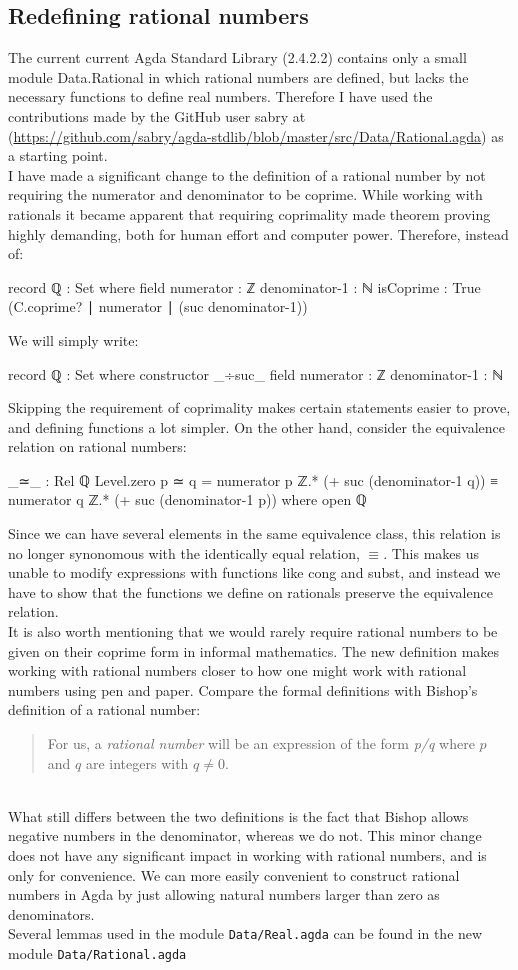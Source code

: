 \documentclass[11pt,a4paper]{article}
\begin{document}
\subsection{Redefining rational numbers}
The current current Agda Standard Library (2.4.2.2) contains only a small module Data.Rational in which rational numbers are defined, but lacks the necessary functions to define real numbers. Therefore I have used the contributions made by the GitHub user sabry at (\url{https://github.com/sabry/agda-stdlib/blob/master/src/Data/Rational.agda}) as a starting point. \\
I have made a significant change to the definition of a rational number by not requiring the numerator and denominator to be coprime. While working with rationals it became apparent that requiring coprimality made theorem proving highly demanding, both for human effort and computer power. Therefore, instead of:
\begin{code}
record ℚ : Set where
  field
    numerator     : ℤ
    denominator-1 : ℕ
    isCoprime     : True (C.coprime? ∣ numerator ∣ (suc denominator-1))
\end{code}
We will simply write:
\begin{code}
record ℚ : Set where
  constructor _÷suc_
  field
    numerator     : ℤ
    denominator-1 : ℕ
\end{code}
Skipping the requirement of coprimality makes certain statements easier to prove, and defining functions a lot simpler. On the other hand, consider the equivalence relation on rational numbers:
\begin{code}
_≃_ : Rel ℚ Level.zero
p ≃ q = numerator p ℤ.* (+ suc (denominator-1 q)) ≡
        numerator q ℤ.* (+ suc (denominator-1 p))
  where open ℚ
\end{code}
Since we can have several elements in the same equivalence class, this relation is no longer synonomous with the identically equal relation, $\equiv$. This makes us unable to modify expressions with functions like cong and subst, and instead we have to show that the functions we define on rationals preserve the equivalence relation.\\
It is also worth mentioning that we would rarely require rational numbers to be given on their coprime form in informal mathematics. The new definition makes working with rational numbers closer to how one might work with rational numbers using pen and paper. Compare the formal definitions with Bishop's definition of a rational number:\\
\blockquote{
For us, a \textit{rational number} will be an expression of the form \textit{p/q} where $p$ and $q$ are integers with $q\neq0$.
}\\
What still differs between the two definitions is the fact that Bishop allows negative numbers in the denominator, whereas we do not. This minor change does not have any significant impact in working with rational numbers, and is only for convenience. We can more easily convenient to construct rational numbers in Agda by just allowing natural numbers larger than zero as denominators.\\
Several lemmas used in the module \texttt{Data/Real.agda} can be found in the new module \texttt{Data/Rational.agda}
\end{document}
